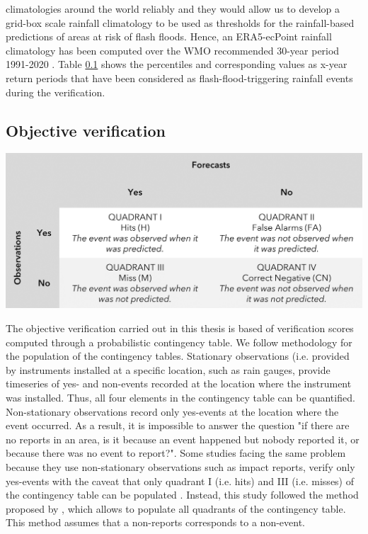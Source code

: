 climatologies around the world reliably \citep{Pillosu_2025a} and they would allow us to develop a grid-box scale rainfall climatology to be used as thresholds for the rainfall-based predictions of areas at risk of flash floods. Hence, an ERA5-ecPoint rainfall climatology has been computed over the WMO recommended 30-year period 1991-2020 \citep{WMO_2017}. Table \ref{} shows the percentiles and corresponding values as x-year return periods that have been considered as flash-flood-triggering rainfall events during the verification.

\subsection{Objective verification}

\begin{table}[htbp]
\centering
{}
\includegraphics[width=\textwidth]{contingency_table.png}
\label{table:contingency_table}
\end{table} 

The objective verification carried out in this thesis is based of verification scores computed through a probabilistic contingency table. We follow \citet{Pillosu_2024} methodology for the population of the contingency tables. Stationary observations (i.e. provided by instruments installed at a specific location, such as rain gauges, provide timeseries of yes- and non-events recorded at the location where the instrument was installed. Thus, all four elements in the contingency table can be quantified. Non-stationary observations record only yes-events at the location where the event occurred. As a result, it is impossible to answer the question "if there are no reports in an area, is it because an event happened but nobody reported it, or because there was no event to report?". Some studies facing the same problem because they use non-stationary observations such as impact reports, verify only yes-events with the caveat that only quadrant I (i.e. hits) and III (i.e. misses) of the contingency table can be populated \citep{Robbins_2018}. Instead, this study followed the method proposed by \citet{Tsonevsky_2018}, which allows to populate all quadrants of the contingency table. This method assumes that a non-reports corresponds to a non-event. 

